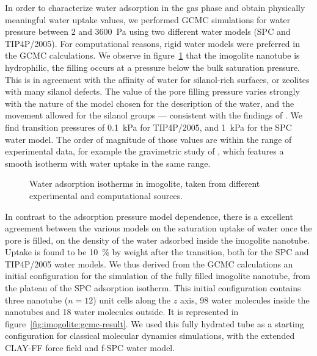 \documentclass[thesis]{subfiles}
\begin{document}
In order to characterize water adsorption in the gas phase and obtain physically
meaningful water uptake values, we performed GCMC simulations for water pressure
between 2 and \SI{3600}{Pa} using two different water models (SPC and
TIP4P/2005). For computational reasons, rigid water models were preferred in the
GCMC calculations. We observe in figure~\ref{fig:imogolite:isotherms} that the
imogolite nanotube is hydrophilic, \ie the filling occurs at a pressure below
the bulk saturation pressure. This is in agreement with the affinity of water
for silanol-rich surfaces, or zeolites with many silanol
defects\cite{Coudert2009}. The value of the pore filling pressure varies
strongly with the nature of the model chosen for the description of the water,
and the movement allowed for the silanol groups --- consistent with the findings
of \citeauthor{Zang2010}\cite{Zang2010}. We find transition pressures of
\SI{0.1}{kPa} for TIP4P/2005, and \SI{1}{kPa} for the SPC water model. The order
of magnitude of those values are within the range of experimental data, for
example the gravimetric study of \citeauthor{Konduri2008}\cite{Konduri2008},
which features a smooth isotherm with water uptake in the same range.

\begin{figure}[ht]
    \centering
    
    \caption{Water adsorption isotherms in imogolite, taken from different
    experimental and computational sources.}
    \label{fig:imogolite:isotherms}
\end{figure}

In contrast to the adsorption pressure model dependence, there is a excellent
agreement between the various models on the saturation uptake of water once the
pore is filled, \ie on the density of the water adsorbed inside the imogolite
nanotube. Uptake is found to be 10~\% by weight after the transition, both for
the SPC and TIP4P/2005 water models. We thus derived from the GCMC calculations
an initial configuration for the simulation of the fully filled imogolite
nanotube, from the plateau of the SPC adsorption isotherm. This initial
configuration contains three nanotube ($n=12$) unit cells along the $z$ axis, 98
water molecules inside the nanotubes and 18 water molecules outside. It is
represented in figure~\ref{fig:imogolite:gcmc-result}. We used this fully
hydrated tube as a starting configuration for classical molecular dynamics
simulations, with the extended CLAY-FF force field and f-SPC water model.
\end{document}
